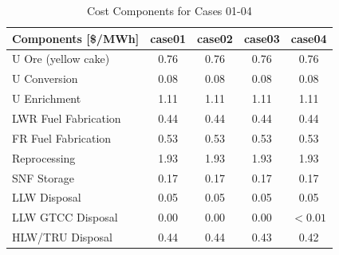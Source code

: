 \begin{table}[htbp]
\begin{center}
\caption{Cost Components for Cases 01-04}
\label{ses_table13_0}
\begin{tabular}{|l|c|c|c|c|}
\hline
\textbf{Components [\$/MWh]} & \textbf{case01} & \textbf{case02} & \textbf{case03} & \textbf{case04} \\
\hline
U Ore (yellow cake)          & 0.76            & 0.76            & 0.76            & 0.76 \\
U Conversion                 & 0.08            & 0.08            & 0.08            & 0.08 \\
U Enrichment                 & 1.11            & 1.11            & 1.11            & 1.11 \\
LWR Fuel Fabrication         & 0.44            & 0.44            & 0.44            & 0.44 \\
FR Fuel Fabrication          & 0.53            & 0.53            & 0.53            & 0.53 \\
Reprocessing                 & 1.93            & 1.93            & 1.93            & 1.93 \\
SNF Storage                  & 0.17            & 0.17            & 0.17            & 0.17 \\
LLW Disposal                 & 0.05            & 0.05            & 0.05            & 0.05 \\
LLW GTCC Disposal            & 0.00            & 0.00            & 0.00            & $<0.01$ \\
HLW/TRU Disposal             & 0.44            & 0.44            & 0.43            & 0.42 \\
\hline
\end{tabular}
\end{center}
\end{table}


